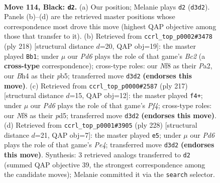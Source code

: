\documentclass[11pt]{article}
\begin{document}
\clearpage

\begin{figure}[p]\centering
\begin{subfigure}{0.46\textwidth}\centering
\resizebox{\linewidth}{!}{%
\newchessgame
\chessboard[
  setfen={5n2/8/1R5p/r3p3/7b/3p3k/1K6/8 b - - 25 114},
  showmover=false,
  pgfstyle=straightmove, color=movearrow, markmove={d3-d2}
]}
\caption{}
\end{subfigure}\hfill
\begin{subfigure}{0.46\textwidth}\centering
\resizebox{\linewidth}{!}{%
\newchessgame
\chessboard[
  setfen={5r2/8/3b4/1p5K/3k4/8/P1B1RP2/8 w - - 0 110},
  showmover=false,
  pgfstyle=straightmove, color=movearrow, markmove={c2-b1}
]}
\caption{}
\end{subfigure}
\\[4pt]
\begin{subfigure}{0.46\textwidth}\centering
\resizebox{\linewidth}{!}{%
\newchessgame
\chessboard[
  setfen={8/6k1/4R2p/3P1p2/7r/4K3/8/8 b - - 0 109},
  showmover=false,
  pgfstyle=straightmove, color=movearrow, markmove={f5-f4}
]}
\caption{}
\end{subfigure}\hfill
\begin{subfigure}{0.46\textwidth}\centering
\resizebox{\linewidth}{!}{%
\newchessgame
\chessboard[
  setfen={7k/2R5/7p/7b/2N1PK1P/8/7r/8 w - - 11 115},
  showmover=false,
  pgfstyle=straightmove, color=movearrow, markmove={e4-e5}
]}
\caption{}
\end{subfigure}
\caption{\textbf{Move 114, Black: \texttt{d2}.} (a) Our position; Melanie plays \texttt{d2} (\texttt{d3d2}). Panels (b)--(d) are the retrieved master positions whose correspondence most drove this move (highest QAP objective among those that transfer to it). (b) Retrieved from \texttt{ccrl\_top\_p0002\#3478} (ply 218) [structural distance $d$=20, QAP obj=19]: the master played \texttt{Bb1}; under $\mu$ our \emph{Pd6} plays the role of that game's \emph{Bc2} (a \textbf{cross-type} correspondence); cross-type roles: our \emph{N}f8 as their \emph{P}a2, our \emph{B}h4 as their \emph{p}b5; transferred move \texttt{d3d2} \textbf{(endorses this move)}. (c) Retrieved from \texttt{ccrl\_top\_p0000\#2587} (ply 217) [structural distance $d$=15, QAP obj=12]: the master played \texttt{f4+}; under $\mu$ our \emph{Pd6} plays the role of that game's \emph{Pf4}; cross-type roles: our \emph{N}f8 as their \emph{p}d5; transferred move \texttt{d3d2} \textbf{(endorses this move)}. (d) Retrieved from \texttt{ccrl\_top\_p0001\#3905} (ply 228) [structural distance $d$=21, QAP obj=7]: the master played \texttt{e5}; under $\mu$ our \emph{Pd6} plays the role of that game's \emph{Pe4}; transferred move \texttt{d3d2} \textbf{(endorses this move)}. Synthesis: 3 retrieved analogs transferred to \texttt{d2} (summed QAP objective 39, the strongest correspondence among the candidate moves); Melanie committed it via the \texttt{search} selector.}
\label{fig:thought-m227}
\end{figure}
\end{document}
